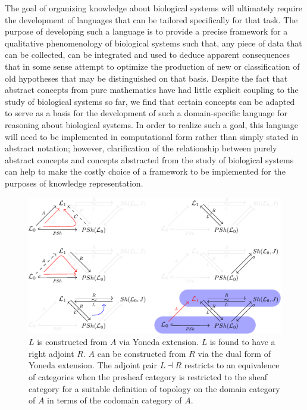 \documentclass[aps,twocolumn]{revtex4-1}
\begin{document}
The goal of organizing knowledge about biological systems will ultimately require the development of languages that can be tailored specifically for that task. The purpose of developing such a language is to provide a precise framework for a qualitative phenomenology of biological systems such that, any piece of data that can be collected, can be integrated and used to deduce apparent consequences that in some sense attempt to optimize the production of new or classification of old hypotheses that may be distinguished on that basis. Despite the fact that abstract concepts from pure mathematics have had little explicit coupling to the study of biological systems so far, we find that certain concepts can be adapted to serve as a basis for the development of such a domain-specific language for reasoning about biological systems. In order to realize such a goal, this language will need to be implemented in computational form rather than simply stated in abstract notation; however, clarification of the relationship between purely abstract concepts and concepts abstracted from the study of biological systems can help to make the costly choice of a framework to be implemented for the purposes of knowledge representation.

\begin{figure}
\noindent\includegraphics[width=1\columnwidth]{fig/arglog.pdf}
\caption{$L$ is constructed from $A$ via Yoneda extension. $L$ is found to have a right adjoint $R$. $A$ can be constructed from $R$ via the dual form of Yoneda extension. The adjoint pair $L \dashv R$ restricts to an equivalence of categories when the presheaf category is restricted to the sheaf category for a suitable definition of topology on the domain category of $A$ in terms of the codomain category of $A$.}
\label{fig:arglog}
\end{figure}
\end{document}
